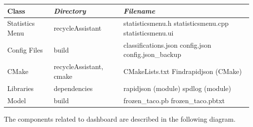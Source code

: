 \documentclass[conference]{IEEEtran}
\begin{document}
\newpage
\begin{table}[htbp!]\normalsize
\begin{center}
\begin{tabular}{|p{1.5cm}|p{2.2cm}|p{3.9cm}|}
\hline
\textbf{Class} & \textbf{\textit{Directory}}& \textbf{\textit{Filename}}\\
\hline
Statistics Menu & recycleAssistant & statisticsmenu.h
\newline
\newline
statisticsmenu.cpp
\newline
\newline
statisticsmenu.ui
\newline
\\ \hline
Config Files & build &
classifications.json
\newline
\newline
config.json
\newline
config.json\_backup
\newline
\\ \hline
CMake & recycleAssistant, cmake & CMakeLists.txt
\newline
\newline
Findrapidjson (CMake)
\newline
\\ \hline
Libraries & dependencies & rapidjson (module)
\newline
\newline
spdlog (module)
\newline
\\ \hline
Model & build &
frozen\_taco.pb
\newline
frozen\_taco.pbtxt
\newline
\\ \hline
\end{tabular}
\label{tab1}
\end{center}
\end{table}

The components related to dashboard are described in the following diagram.
\end{document}
